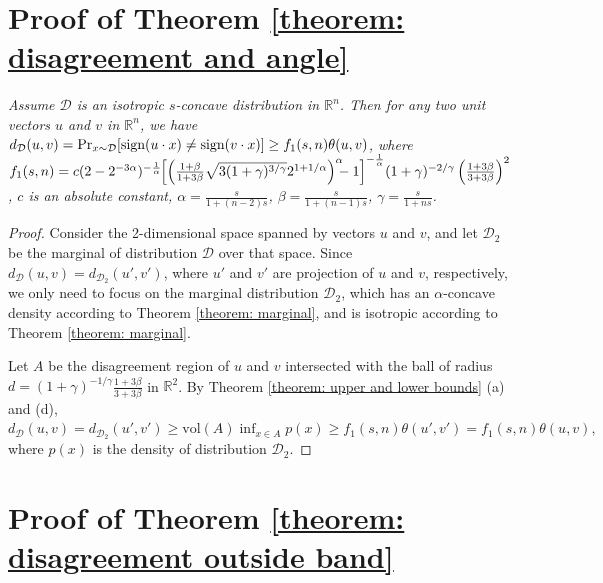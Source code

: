 \documentclass[11pt]{article}
\newcommand{\R}{\mathbb{R}}
\newcommand{\red}[1]{{\color{black}#1}}
\newcommand{\sign}{\textup{sign}}
\newtheorem{remark}{Remark}
\begin{document}
{{{{\section{Proof of Theorem \ref{theorem: disagreement and angle}}

\emph{Assume $\mathcal{D}$ is an isotropic $s$-concave distribution in $\R^n$. Then for any two unit vectors $u$ and $v$ in $\R^n$, we have $d_\mathcal{D}(u,v)=\Pr_{x\sim\mathcal{D}}[\sign(u\cdot x)\not=\sign(v\cdot x)]\ge f_1(s,n)\theta(u,v)$, where $f_1(s,n)=c\red{(2-2^{-3\alpha})^{-\frac{1}{\alpha}}\hspace{-0.1cm}\left[\left(\frac{1+\beta}{1+3\beta}\sqrt{3(1+\gamma)^{3/\gamma}}2^{1+1/\alpha}\right)^{\alpha}\hspace{-0.2cm}-1\right]^{-\frac{1}{\alpha}}}(1+\gamma)^{-2/\gamma}\left(\frac{1+3\beta}{3+3\beta}\right)^2$, $c$ is an absolute constant, $\alpha=\frac{s}{1+(n-2)s}$, $\beta=\frac{s}{1+(n-1)s}$, $\gamma=\frac{s}{1+ns}$.}


\begin{proof}
Consider the 2-dimensional space spanned by vectors $u$ and $v$, and let $\mathcal{D}_2$ be the marginal of distribution $\mathcal{D}$ over that space. Since $d_{\mathcal{D}}(u,v)=d_{\mathcal{D}_2}(u',v')$, where $u'$ and $v'$ are projection of $u$ and $v$, respectively, we only need to focus on the marginal distribution $\mathcal{D}_2$, which has an $\alpha$-concave density according to Theorem \ref{theorem: marginal}, and is isotropic according to Theorem \ref{theorem: marginal}.

Let $A$ be the disagreement region of $u$ and $v$ intersected with the ball of radius $d=(1+\gamma)^{-1/\gamma}\frac{1+3\beta}{3+3\beta}$ in $\R^2$. By Theorem \ref{theorem: upper and lower bounds} (a) and (d),
$
d_{\mathcal{D}}(u,v)=d_{\mathcal{D}_2}(u',v')\ge \mbox{vol}(A)\inf_{x\in A} p(x)\ge f_1(s,n)\theta(u',v')=f_1(s,n)\theta(u,v),
$
where $p(x)$ is the density of distribution $\mathcal{D}_2$.
\end{proof}



\section{Proof of Theorem \ref{theorem: disagreement outside band}}
\label{section: proof of disagreement outside band}

}}}}
\end{document}
